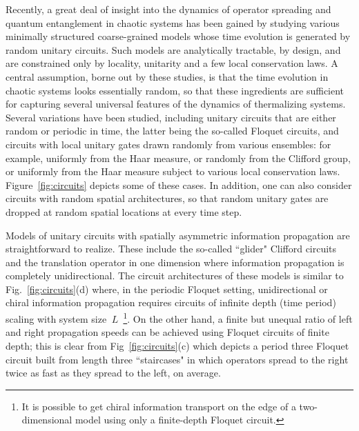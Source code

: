 \documentclass[aps,prx,reprint,superscriptaddress, longbibliography]{revtex4-1}
\newcommand{\charlie}[1]{{\color{Magenta}{{#1}}}}
\begin{document}
Recently, a great deal of insight into the dynamics of operator spreading and quantum entanglement in chaotic systems has been gained by studying various minimally structured coarse-grained models whose time evolution is generated by random unitary circuits. 
Such models are analytically tractable, by design, and are constrained only by locality, unitarity and a few local conservation laws. 
A central assumption, borne out by these studies, is that the time evolution in chaotic systems looks essentially random, so that these ingredients are sufficient for capturing several universal features of the dynamics of thermalizing systems. Several variations have been studied, including unitary circuits that are either random or periodic in time, the latter being the so-called Floquet circuits, and circuits with local unitary gates drawn randomly from various ensembles: for example, uniformly from the Haar measure, or randomly from the Clifford group, or uniformly from the Haar measure subject to various local conservation laws. Figure~\ref{fig:circuits} depicts some of these cases. In addition, one can also consider circuits with random spatial architectures, so that random unitary gates are dropped at random spatial locations at every time step.    

Models of unitary circuits with spatially asymmetric information propagation are straightforward to realize. These include the so-called ``glider" Clifford circuits and the translation operator in one dimension where information propagation is completely unidirectional. The circuit architectures of these models is similar to Fig.~\ref{fig:circuits}(d) where, in the periodic Floquet setting, unidirectional or chiral information propagation requires circuits of infinite depth (time period) scaling with system size $~L$~\footnote{It is possible to get chiral information transport on the edge of a two-dimensional model using only a finite-depth Floquet circuit.}. On the other hand, a finite but unequal ratio of left and right propagation speeds can be achieved using Floquet circuits of finite depth; this is clear from Fig~\ref{fig:circuits}(c) which depicts a period three Floquet circuit built from length three ``staircases" in which operators spread to the right twice as fast as they spread to the left, on average. 
\end{document}
